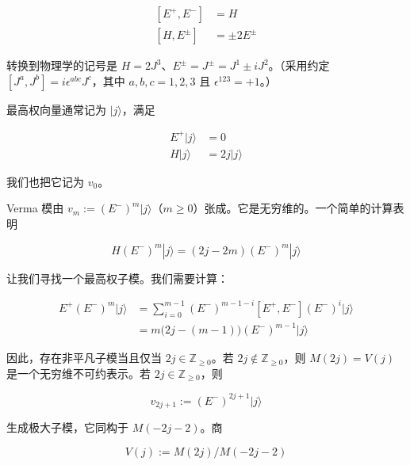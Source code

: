 \begin{equation}
  \begin{aligned}
    [E^+,E^-] &= H\\
    [H,E^\pm] &= \pm2E^\pm
  \end{aligned}
  \tag{4.117}
  \label{eq:4.117}
\end{equation}

转换到物理学的记号是 $H=2J^3$、$E^\pm=J^\pm=J^1\pm iJ^2$。（采用约定 $[J^a,J^b]=i\epsilon^{abc}J^c$，其中 $a,b,c=1,2,3$ 且 $\epsilon^{123}=+1$。）

最高权向量通常记为 $|j\rangle$，满足

\begin{equation}
  \begin{aligned}
    E^+|j\rangle &= 0\\
    H|j\rangle &= 2j|j\rangle
  \end{aligned}
  \tag{4.118}
  \label{eq:4.118}
\end{equation}

我们也把它记为 $v_0$。

Verma 模由 $v_m:=(E^-)^m|j\rangle$（$m\ge0$）张成。它是无穷维的。一个简单的计算表明

\begin{equation}
  H(E^-)^m|j\rangle=(2j-2m)(E^-)^m|j\rangle
  \tag{4.119}
  \label{eq:4.119}
\end{equation}

让我们寻找一个最高权子模。我们需要计算：

\begin{equation}
  \begin{aligned}
    E^+(E^-)^m|j\rangle &= \sum_{i=0}^{m-1}(E^-)^{m-1-i}[E^+,E^-](E^-)^i|j\rangle\\
    &= m\Big(2j-(m-1)\Big)(E^-)^{m-1}|j\rangle
  \end{aligned}
  \tag{4.120}
  \label{eq:4.120}
\end{equation}

因此，存在非平凡子模当且仅当 $2j\in\mathbb{Z}_{\geq0}$。若 $2j\notin\mathbb{Z}_{\geq0}$，则 $M(2j)=V(j)$ 是一个无穷维不可约表示。若 $2j\in\mathbb{Z}_{\geq0}$，则

\begin{equation}
  v_{2j+1}:=(E^-)^{2j+1}|j\rangle
  \tag{4.121}
  \label{eq:4.121}
\end{equation}

生成极大子模，它同构于 $M(-2j-2)$。商

\begin{equation}
  V(j):=M(2j)/M(-2j-2)
  \tag{4.122}
  \label{eq:4.122}
\end{equation}

